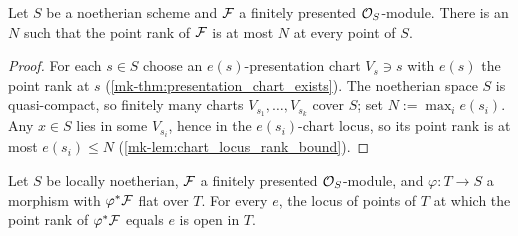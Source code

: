 \begin{lemma}
  \label{mk-lem:point_rank_bounded}
  \leanok

  Let \(S\) be a noetherian scheme and \(\mathcal{F}\) a finitely presented
  \(\mathcal{O}_S\)-module.  There is an \(N\) such that the point rank of \(\mathcal{F}\)
  is at most \(N\) at every point of \(S\).
\end{lemma}

\begin{proof}
  \leanok
  For each \(s \in S\) choose an \(e(s)\)-presentation chart \(V_s \ni s\)
  with \(e(s)\) the point rank at \(s\)
  (\ref{mk-thm:presentation_chart_exists}).  The noetherian space \(S\) is
  quasi-compact, so finitely many charts \(V_{s_1}, \dots, V_{s_k}\) cover
  \(S\); set \(N := \max_i e(s_i)\).  Any \(x \in S\) lies in some
  \(V_{s_i}\), hence in the \(e(s_i)\)-chart locus, so its point rank is at
  most \(e(s_i) \le N\) (\ref{mk-lem:chart_locus_rank_bound}).
\end{proof}

\begin{theorem}
  \label{mk-thm:rank_fibers_open}
  \leanok

  Let \(S\) be locally noetherian, \(\mathcal{F}\) a finitely presented
  \(\mathcal{O}_S\)-module, and \(\varphi : T \to S\) a morphism with
  \(\varphi^*\mathcal{F}\) flat over \(T\).  For every \(e\), the locus of points of
  \(T\) at which the point rank of \(\varphi^*\mathcal{F}\) equals \(e\) is open in
  \(T\).
\end{theorem}

